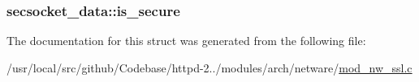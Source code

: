 \subsubsection[{\texorpdfstring{is\+\_\+secure}{is_secure}}]{ secsocket\+\_\+data\+::is\+\_\+secure}\hypertarget{structsecsocket__data_aea7a7bb32a30e02fbe925e548b72e9cb}{}\label{structsecsocket__data_aea7a7bb32a30e02fbe925e548b72e9cb}


The documentation for this struct was generated from the following file\+:\begin{DoxyCompactItemize}
\item 
/usr/local/src/github/\+Codebase/httpd-\/2../modules/arch/netware/\hyperlink{mod__nw__ssl_8c}{mod\+\_\+nw\+\_\+ssl.\+c}\end{DoxyCompactItemize}
